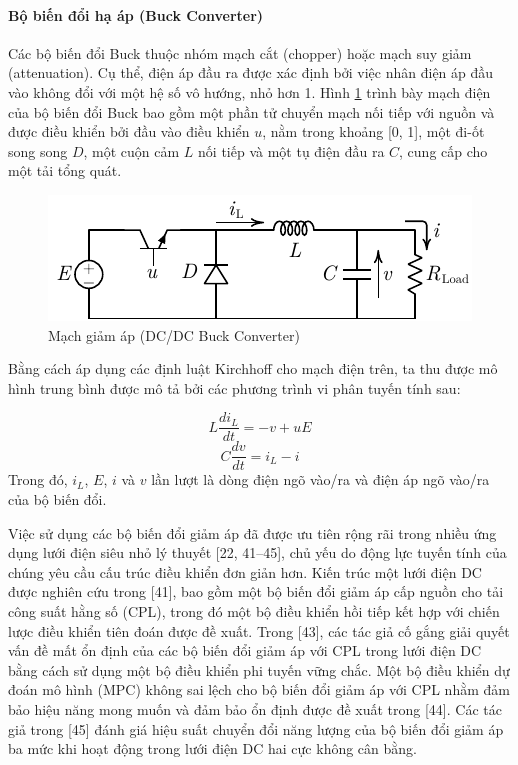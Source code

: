 \paragraph{Bộ biến đổi hạ áp (Buck Converter)}
Các bộ biến đổi Buck thuộc nhóm mạch cắt (chopper) hoặc mạch suy giảm (attenuation). Cụ thể, điện áp đầu ra được xác định bởi việc nhân điện áp đầu vào không đổi với một hệ số vô hướng, nhỏ hơn 1. Hình \ref{fig:C2_1} trình bày mạch điện của bộ biến đổi Buck bao gồm một phần tử chuyển mạch nối tiếp với nguồn và được điều khiển bởi đầu vào điều khiển $u$, nằm trong khoảng [0, 1], một đi-ốt song song $D$, một cuộn cảm $L$ nối tiếp và một tụ điện đầu ra $C$, cung cấp cho một tải tổng quát. \par
\begin{figure}
    \centering
    \includegraphics[width= 0.7 \textwidth]{Figures/Content_Pages/Chapter_2/C2_1.pdf}
    \caption{Mạch giảm áp (DC/DC Buck Converter)}
    \label{fig:C2_1}
\end{figure}
Bằng cách áp dụng các định luật Kirchhoff cho mạch điện trên, ta thu được mô hình trung bình được mô tả bởi các phương trình vi phân tuyến tính sau: \par
\begin{equation} \label{E2_1}
    L\frac{di_L}{dt} = -v+uE
\end{equation}
\begin{equation} \label{E2_2}
    C\frac{dv}{dt} = i_L - i 
\end{equation}
\noindent Trong đó, $i_L$, $E$, $i$ và $v$ lần lượt là dòng điện ngõ vào/ra và điện áp ngõ vào/ra của bộ biến đổi. \par
Việc sử dụng các bộ biến đổi giảm áp đã được ưu tiên rộng rãi trong nhiều ứng dụng lưới điện siêu nhỏ lý thuyết [22, 41–45], chủ yếu do động lực tuyến tính của chúng yêu cầu cấu trúc điều khiển đơn giản hơn. Kiến trúc một lưới điện DC được nghiên cứu trong [41], bao gồm một bộ biến đổi giảm áp cấp nguồn cho tải công suất hằng số (CPL), trong đó một bộ điều khiển hồi tiếp kết hợp với chiến lược điều khiển tiên đoán được đề xuất. Trong [43], các tác giả cố gắng giải quyết vấn đề mất ổn định của các bộ biến đổi giảm áp với CPL trong lưới điện DC bằng cách sử dụng một bộ điều khiển phi tuyến vững chắc. Một bộ điều khiển dự đoán mô hình (MPC) không sai lệch cho bộ biến đổi giảm áp với CPL nhằm đảm bảo hiệu năng mong muốn và đảm bảo ổn định được đề xuất trong [44]. Các tác giả trong [45] đánh giá hiệu suất chuyển đổi năng lượng của bộ biến đổi giảm áp ba mức khi hoạt động trong lưới điện DC hai cực không cân bằng. \par
